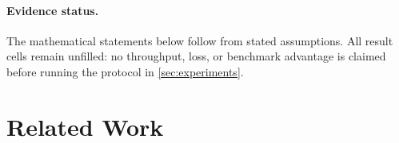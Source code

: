 \documentclass{article}
\begin{document}
\paragraph{Evidence status.}
The mathematical statements below follow from stated assumptions. All result
cells remain unfilled: no throughput, loss, or benchmark advantage is claimed
before running the protocol in \cref{sec:experiments}.


\section{Related Work}
\label{sec:related}
\end{document}
